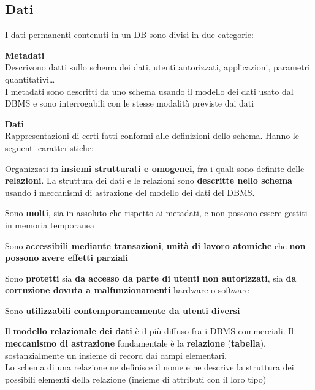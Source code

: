 \documentclass[10pt]{book}
\begin{document}
\subsection{Dati}
I dati permanenti contenuti in un DB sono divisi in due categorie:
\begin{list}{}{}
	\item \textbf{Metadati}\\
	Descrivono datti sullo schema dei dati, utenti autorizzati, applicazioni, parametri quantitativi\ldots\\
	I metadati sono descritti da uno schema usando il modello dei dati usato dal DBMS e sono interrogabili con le stesse modalità previste dai dati
	\item \textbf{Dati}\\
	Rappresentazioni di certi fatti conformi alle definizioni dello schema. Hanno le seguenti caratteristiche:
	\begin{list}{}{}
		\item Organizzati in \textbf{insiemi strutturati e omogenei}, fra i quali sono definite delle \textbf{relazioni}. La struttura dei dati e le relazioni sono \textbf{descritte nello schema} usando i meccanismi di astrazione del modello dei dati del DBMS.
		\item Sono \textbf{molti}, sia in assoluto che rispetto ai metadati, e non possono essere gestiti in memoria temporanea
		\item Sono \textbf{accessibili mediante transazioni}, \textbf{unità di lavoro atomiche} che \textbf{non possono avere effetti parziali}
		\item Sono \textbf{protetti} sia \textbf{da accesso da parte di utenti non autorizzati}, sia \textbf{da corruzione dovuta a malfunzionamenti} hardware o software
		\item Sono \textbf{utilizzabili contemporaneamente da utenti diversi}
	\end{list}
\end{list}
Il \textbf{modello relazionale dei dati} è il più diffuso fra i DBMS commerciali. Il \textbf{meccanismo di astrazione} fondamentale è la \textbf{relazione} (\textbf{tabella}), sostanzialmente un insieme di record dai campi elementari.\\
Lo schema di una relazione ne definisce il nome e ne descrive la struttura dei possibili elementi della relazione (insieme di attributi con il loro tipo)
\end{document}

